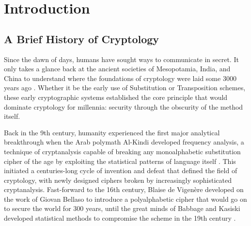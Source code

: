 \documentclass[10pt, a4paper]{report}
\begin{document}
\clearpage
\listofalgorithms
{}

\clearpage
{}

\chapter{Introduction}

\section{A Brief History of Cryptology}


Since the dawn of days, humans have sought ways to communicate in secret. It only takes a glance back at the ancient societies of Mesopotamia, India, and China to understand where the foundations of cryptology were laid some 3000 years ago \cite{Kahn1967Code}. Whether it be the early use of Substitution or Transposition schemes, these early cryptographic systems established the core principle that would dominate cryptology for millennia: security through the obscurity of the method itself. 

Back in the 9th century, humanity experienced the first major analytical breakthrough when the Arab polymath Al-Kindi developed frequency analysis, a technique of cryptanalysis capable of breaking any monoalphabetic substitution cipher of the age by exploiting the statistical patterns of language itself \cite{AlKadi1992}. This initiated a centuries-long cycle of invention and defeat that defined the field of cryptology, with newly designed ciphers broken by increasingly sophisticated cryptanalysis. Fast-forward to the 16th century, Blaise de Vigen\`ere developed on the work of Giovan Bellaso to introduce a polyalphabetic cipher that would go on to secure the world for 300 years, until the great minds of Babbage and Kasiski developed statistical methods to compromise the scheme in the 19th century \cite{Singh1999, Bauer2021}.
\end{document}
